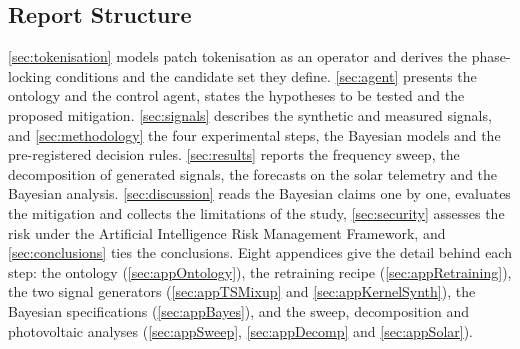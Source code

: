 \subsection*{Report Structure}
\autoref{sec:tokenisation} models patch tokenisation as an operator and derives the phase-locking conditions and the candidate set they define\@. \autoref{sec:agent} presents the ontology and the control agent, states the hypotheses to be tested and the proposed mitigation\@. \autoref{sec:signals} describes the synthetic and measured signals, and \autoref{sec:methodology} the four experimental steps, the Bayesian models and the pre-registered decision rules\@. \autoref{sec:results} reports the frequency sweep, the decomposition of generated signals, the forecasts on the solar telemetry and the Bayesian analysis\@. \autoref{sec:discussion} reads the Bayesian claims one by one, evaluates the mitigation and collects the limitations of the study, \autoref{sec:security} assesses the risk under the Artificial Intelligence Risk Management Framework, and \autoref{sec:conclusions} ties the conclusions. Eight appendices give the detail behind each step: the ontology (\autoref{sec:appOntology}), the retraining recipe (\autoref{sec:appRetraining}), the two signal generators (\autoref{sec:appTSMixup} and \autoref{sec:appKernelSynth}), the Bayesian specifications (\autoref{sec:appBayes}), and the sweep, decomposition and photovoltaic analyses (\autoref{sec:appSweep}, \autoref{sec:appDecomp} and \autoref{sec:appSolar}).
